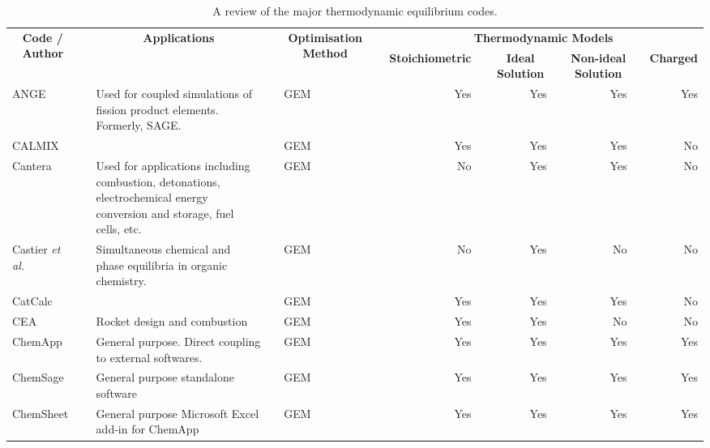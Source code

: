 	
\begin{landscape}
\pagestyle{empty}
	\begin{longtable}{@{}p{}cp{}clcrcrcrcr@{}}
		\caption{A review of the major thermodynamic equilibrium codes.}\\
		\ra{1.3}\\
		\toprule
		\multicolumn{1}{c}{\multirow{2}{*}{\textbf{Code / Author}}} &\phantom{} & \multicolumn{1}{c}{\multirow{2}{*}{\textbf{Applications}}} & \phantom{} & \multicolumn{1}{c}{\multirow{2}{*}{\textbf{Optimisation Method}}} &\phantom{} & \multicolumn{7}{c}{\textbf{Thermodynamic Models}} \\
		\cmidrule{7-13}
		\multicolumn{1}{c}{} & \phantom{} & \multicolumn{1}{c}{} & \phantom{} & \multicolumn{1}{c}{} & \phantom{} & \multicolumn{1}{c}{\textbf{Stoichiometric}} & \phantom{} & \multicolumn{1}{c}{\textbf{Ideal Solution}} & \phantom{} & \multicolumn{1}{c}{\textbf{Non-ideal Solution}} & \phantom{} & \multicolumn{1}{c}{\textbf{Charged}} \\
		\midrule
		\endhead
		ANGE \cite{Baurens:2014aa} && {Used for coupled simulations of fission product elements. Formerly, SAGE.} && GEM && Yes && Yes && Yes && Yes \\
		CALMIX \cite{GREINER1988529} && {} && GEM && Yes && Yes && Yes && No \\
		Cantera \cite{Goodwin:aa} && {Used for applications including combustion, detonations, electrochemical energy conversion and storage, fuel cells, etc.} && GEM && No && Yes && Yes && No \\ 
		Castier \textit{et al.} \cite{CASTIER1989237} && {Simultaneous chemical and phase equilibria in organic chemistry.} && GEM && No && Yes && No && No \\
		CatCalc \cite{Shobu09} && {} && GEM && Yes && Yes && Yes && No \\
		CEA \cite{Gordon94} && {Rocket design and combustion} && GEM && Yes && Yes && No && No \\
		ChemApp \cite{Eriksson:2008aa} && {General purpose. Direct coupling to external softwares.} && GEM && Yes && Yes && Yes && Yes\\
		ChemSage \cite{Eriksson90} && {General purpose standalone software} && GEM && Yes && Yes && Yes && Yes\\
		ChemSheet \cite{Koukkari:2005aa} && {General purpose Microsoft Excel add-in for ChemApp} && GEM && Yes && Yes && Yes && Yes\\

\end{longtable}
\end{landscape}
